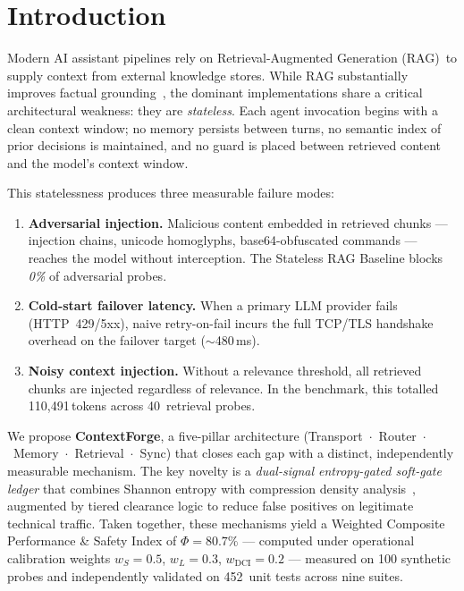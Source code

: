 \documentclass[11pt,twocolumn]{article}
\begin{document}
\section{Introduction}
\label{sec:intro}

Modern AI assistant pipelines rely on Retrieval-Augmented Generation
(RAG)~to supply context from external knowledge stores. While RAG
substantially improves factual grounding~\cite{lewis2020rag}, the
dominant implementations share a critical architectural weakness: they
are \emph{stateless}. Each agent invocation begins with a clean context
window; no memory persists between turns, no semantic index of prior
decisions is maintained, and no guard is placed between retrieved
content and the model's context window.

This statelessness produces three measurable failure modes:

\begin{enumerate}[leftmargin=*]
  \item \textbf{Adversarial injection.} Malicious content embedded in
    retrieved chunks --- injection chains, unicode homoglyphs,
    base64-obfuscated commands --- reaches the model without
    interception. The Stateless RAG Baseline blocks \emph{0\%} of
    adversarial probes.

  \item \textbf{Cold-start failover latency.} When a primary LLM
    provider fails (HTTP~429/5xx), naive retry-on-fail incurs the full
    TCP/TLS handshake overhead on the failover target ($\sim$480\,ms).

  \item \textbf{Noisy context injection.} Without a relevance
    threshold, all retrieved chunks are injected regardless of
    relevance. In the benchmark, this totalled 110,491\,tokens across
    40~retrieval probes.
\end{enumerate}

We propose \textbf{ContextForge}, a five-pillar architecture
(Transport~$\cdot$~Router~$\cdot$~Memory~$\cdot$~Retrieval~$\cdot$~Sync)
that closes each gap with a distinct, independently measurable
mechanism. The key novelty is a \emph{dual-signal entropy-gated
soft-gate ledger} that combines Shannon entropy with compression density
analysis~\cite{ziv1977}, augmented by tiered clearance logic to reduce
false positives on legitimate technical traffic. Taken together, these
mechanisms yield a Weighted Composite Performance \& Safety Index of
$\Phi = 80.7\%$ --- computed under operational calibration weights
$w_S=0.5$, $w_L=0.3$, $w_\text{DCI}=0.2$ --- measured on 100 synthetic
probes and independently validated on 452~unit tests
across nine suites.
\end{document}
